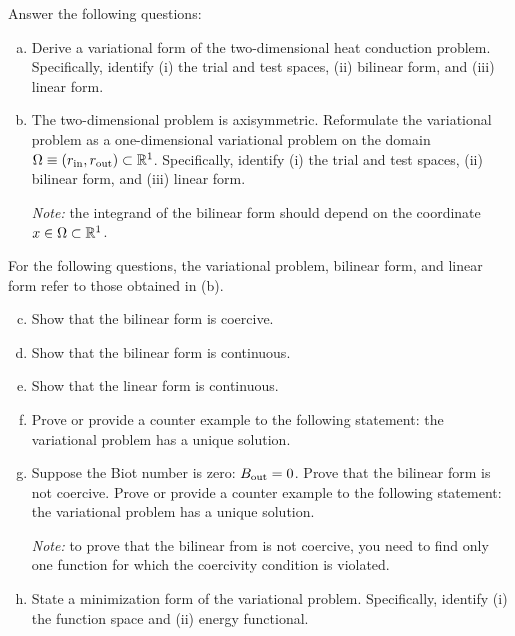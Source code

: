 \documentclass[preprint,11pt]{article}
\begin{document}
Answer the following questions:
\begin{enumerate}[(a)]
\item Derive a variational form of the two-dimensional heat conduction problem.  Specifically, identify (i) the trial and test spaces, (ii) bilinear form, and (iii) linear form.
\item The two-dimensional problem is axisymmetric. Reformulate the variational problem as a one-dimensional variational problem on the domain $\Omega \equiv (r_{\rm in}, r_{\rm out}) \subset \mathbb{R}^1$.  Specifically, identify (i) the trial and test spaces, (ii) bilinear form, and (iii) linear form.

  \emph{Note:} the integrand of the bilinear form should depend on the coordinate $x \in \Omega \subset \mathbb{R}^1$.
\end{enumerate}
For the following questions, the variational problem, bilinear form, and linear form refer to those obtained in (b). 
\begin{enumerate}[(a)]
  \setcounter{enumi}{2}
\item Show that the bilinear form is coercive.
\item Show that the bilinear form is continuous.
\item Show that the linear form is continuous.
\item Prove or provide a counter example to the following statement: the variational problem has a unique solution.
\item Suppose the Biot number is zero: $B_{\rm out} = 0$.  Prove that the bilinear form is not coercive.  Prove or provide a counter example to the following statement:  the variational problem has a unique solution.

  \emph{Note:} to prove that the bilinear from is not coercive, you need to find only one function for which the coercivity condition is violated.
\item State a minimization form of the variational problem.  Specifically, identify (i) the function space and (ii) energy functional.
\end{enumerate}
\end{document}
